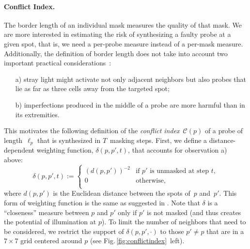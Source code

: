 \documentclass{llncs}
\begin{document}
\paragraph{Conflict Index.}
The border length of an individual mask measures the quality of that
mask. We are more interested in estimating the risk of synthesizing a faulty
probe at a given spot, that is, we need a per-probe measure
instead of a per-mask measure. Additionally,
the definition of border length does not take into account two
important practical considerations~\cite{KAHNG03A}:
\begin{itemize}
\item[a)] stray light might activate not only adjacent neighbors but
  also probes that lie as far as three cells away from the targeted
  spot;
\item[b)] imperfections produced in the middle of a probe are more
  harmful than in its extremities.
\end{itemize}
This motivates the following definition of the \emph{conflict
  index}~$\mathcal{C}(p)$ of a probe of
length~$\ell_{p}$ that is synthesized in $T$~masking steps. First, we
define a distance-dependent weighting function, $\delta(p,p',t)$, that
accounts for observation a) above:
\begin{equation}
\label{eq:dist_weight}
\delta(p,p',t) :=
        \left\{
                \begin{array}{ll}
                        (d(p,p'))^{-2} & \mbox{if $p'$ is unmasked at step $t$}, \\
                        0 & \mbox{otherwise}, \\
                \end{array}
        \right.
\end{equation}
where $d(p,p')$ is the Euclidean distance between the spots of~$p$ and~$p'$.
This form of weighting function is the same as suggested in
\cite{KAHNG03A}.  Note that $\delta$ is a ``closeness'' measure
between $p$ and $p'$ only if $p'$ is
not masked (and thus creates the potential of illumination at $p$). To
limit the number of neighbors that need to be considered, we
restrict the support of $\delta(p,p',\cdot)$ to those $p'\neq p$ that
are in a $7\times 7$ grid centered around $p$ (see
Fig.\,\ref{fig:conflictindex}~left).
\end{document}
